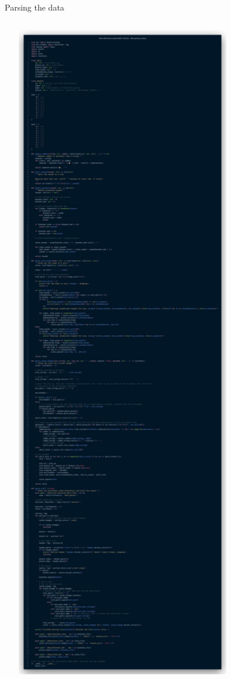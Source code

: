 \documentclass[10pt]{beamer}
\begin{document}
\begin{frame}{Parsing the data}
\begin{columns}[c]
\begin{column}{0.3\textwidth}
        \includegraphics[width=0.8\textwidth, height=\textheight, keepaspectratio]{code1200.png}
      \end{column}
    \end{columns}
  \end{frame}
\end{document}
